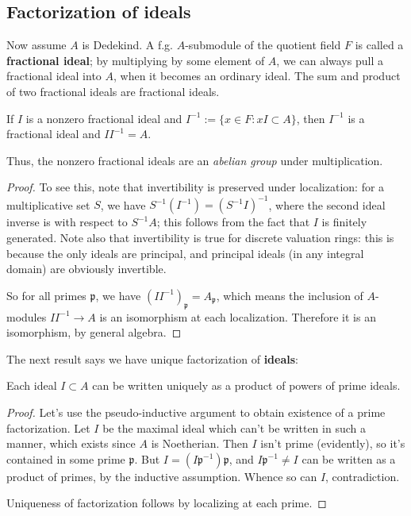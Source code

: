 \subsection{Factorization of ideals}
Now assume  $A$ is Dedekind. A f.g. $A$-submodule of the quotient field $F$ is called a \textbf{fractional ideal}; by multiplying by some element of $A$, we can always pull a fractional ideal into $A$, when it becomes an ordinary ideal.  The sum and product of two fractional ideals are fractional ideals.

\begin{theorem}[Invertibility]  If $I$ is a nonzero fractional ideal and $ I^{-1} := \{ x \in F: xI \subset A \}$, then $I^{-1}$ is a fractional ideal and $I I^{-1} = A$.
\end{theorem}

Thus, the nonzero fractional ideals are an \emph{abelian group} under multiplication.

\begin{proof}
To see this, note that invertibility is preserved under localization: for a multiplicative set $S$, we have $S^{-1} ( I^{-1} ) = (S^{-1} I)^{-1}$, where the second ideal inverse is with respect to $S^{-1}A$; this follows from the fact that $I$ is finitely generated.  Note also that invertibility is true for discrete valuation rings: this is because the only ideals are principal, and principal ideals (in any integral domain) are obviously invertible.

So for all primes $\mathfrak{p}$, we have $(I I^{-1})_{\mathfrak{p}} = A_{\mathfrak{p}}$, which means the inclusion of $A$-modules $I I^{-1} \to A$ is an isomorphism at each localization.  Therefore it is an isomorphism, by general algebra.
\end{proof} 

The next result says we have unique factorization of \textbf{ideals}:
\begin{theorem}[Factorization] Each ideal $I \subset A$ can be written uniquely as a product of powers of prime ideals.
\end{theorem}
\begin{proof}
Let's use the pseudo-inductive argument to obtain existence of a prime factorization.  Let $I$ be the maximal ideal which can't be written in such a manner, which exists since $A$ is Noetherian.  Then $I$ isn't prime (evidently), so it's contained in some prime $\mathfrak{p}$.  But $I = (I\mathfrak{p}^{-1})\mathfrak{p}$, and $I\mathfrak{p}^{-1} \neq I$ can be written as a product of primes, by the inductive assumption. Whence so can $I$, contradiction.

Uniqueness of factorization follows by localizing at each prime.
\end{proof}

